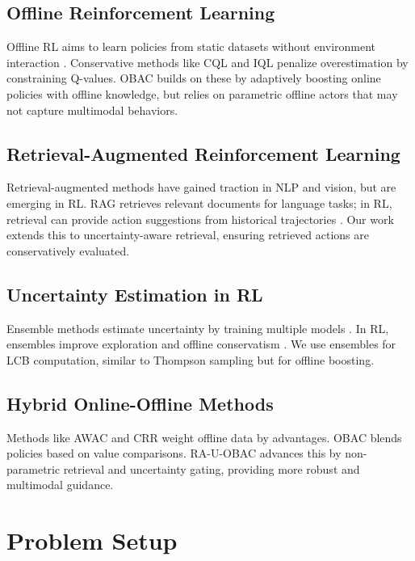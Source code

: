 \documentclass[11pt,a4paper]{article}
\begin{document}
\subsection{Offline Reinforcement Learning}
Offline RL aims to learn policies from static datasets without environment interaction \cite{levine2020offline}. Conservative methods like CQL \cite{kumar2020conservative} and IQL \cite{kostrikov2022offline} penalize overestimation by constraining Q-values. OBAC \cite{obac2024} builds on these by adaptively boosting online policies with offline knowledge, but relies on parametric offline actors that may not capture multimodal behaviors.

\subsection{Retrieval-Augmented Reinforcement Learning}
Retrieval-augmented methods have gained traction in NLP and vision, but are emerging in RL. RAG \cite{lewis2020retrieval} retrieves relevant documents for language tasks; in RL, retrieval can provide action suggestions from historical trajectories \cite{ramakrishnan2022experience}. Our work extends this to uncertainty-aware retrieval, ensuring retrieved actions are conservatively evaluated.

\subsection{Uncertainty Estimation in RL}
Ensemble methods estimate uncertainty by training multiple models \cite{lakshminarayanan2017}. In RL, ensembles improve exploration \cite{osband2016deep} and offline conservatism \cite{an2021uncertainty}. We use ensembles for LCB computation, similar to Thompson sampling but for offline boosting.

\subsection{Hybrid Online-Offline Methods}
Methods like AWAC \cite{nair2020awac} and CRR \cite{wang2020critic} weight offline data by advantages. OBAC \cite{obac2024} blends policies based on value comparisons. RA-U-OBAC advances this by non-parametric retrieval and uncertainty gating, providing more robust and multimodal guidance.

\section{Problem Setup}
\label{sec:problem}
\end{document}
